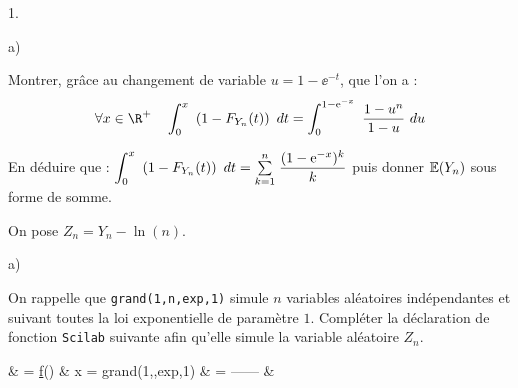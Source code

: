 \documentclass[11pt]{article}%
\begin{document}
\begin{noliste}{1.}
\item
  \begin{noliste}{a)}
    \setlength{\itemsep}{2mm}
  \item Montrer, grâce au changement de variable $u = 1-\ee^{-t}$, que
    l'on a :
    \[
    \forall x \in \R^+ \quad \dint{0}{x} \left(1-F_{Y_{n}}(t)\right) \
    dt = \dint{0}{1 - \ee^{-x}} \dfrac{1-u^{n}}{1-u} \ du
    \]
  \item En déduire que : $ \displaystyle \int_{0}^{x}\  \left(1-F_{Y_{n}}(t)\right) \
    dt = {\textstyle\sum\limits_{k = 1}^{n}}\hspace{.1cm} \dfrac{(1-\text{e}^{-x})^{k}}{k}$ puis donner
    $\mathbb{E}(Y_{n})$ sous forme de somme.
  \end{noliste}

\item On pose $Z_{n} = Y_{n}-\ln(n)$.
  \begin{noliste}{a)}
    \setlength{\itemsep}{2mm}
  \item On rappelle que {\tt grand(1,n,\ttq{}exp\ttq{},1)} simule
    $n$ variables aléatoires indépendantes et suivant toutes la loi
    exponentielle de paramètre $1$. Compléter la déclaration de
    fonction {\tt Scilab} suivante afin qu'elle simule la variable
    aléatoire $Z_{n}$.
    \begin{scilab}
      &   = \underline{f}() \nl %
      & \qquad x = grand(1,,\ttq{}exp\ttq{},1) \nl %
      & \qquad \tcVar{Z} = ------ \nl %
      & \tcFun{endfunction}
    \end{scilab}


\newpage



\end{noliste}
\end{noliste}
\end{document}
